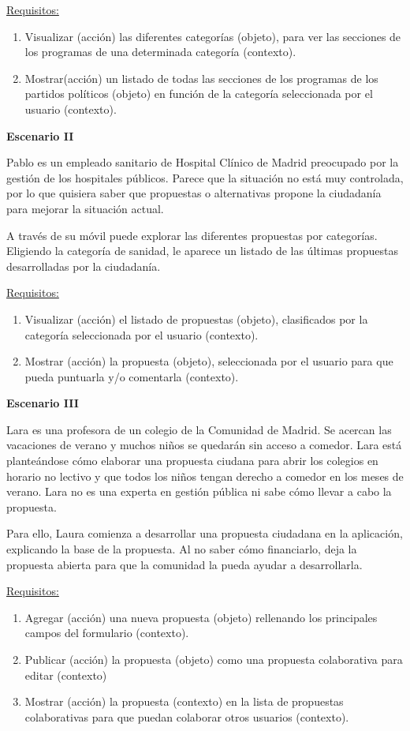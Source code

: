 \underline{Requisitos:}

\begin{enumerate}
\item Visualizar (acción) las diferentes categorías (objeto), para ver las secciones de los programas de una determinada categoría (contexto).
\item Mostrar(acción) un listado de todas las secciones de los programas de los partidos  políticos (objeto) en función de la categoría seleccionada por el usuario (contexto).
\end{enumerate}

\textbf{Escenario II}

Pablo es un empleado sanitario de Hospital Clínico de Madrid preocupado por la gestión de los hospitales públicos. Parece que la situación no está muy controlada, por lo que quisiera saber que propuestas o alternativas propone la ciudadanía para mejorar la situación actual.

A través de su móvil puede explorar las diferentes propuestas por categorías. Eligiendo la categoría de sanidad, le aparece un listado de las últimas propuestas desarrolladas por la ciudadanía.

\underline{Requisitos:}

\begin{enumerate}
\item Visualizar (acción) el listado de propuestas (objeto), clasificados por la categoría seleccionada por el usuario (contexto).
\item Mostrar (acción) la propuesta (objeto), seleccionada por el usuario para que pueda puntuarla y/o comentarla (contexto).
\end{enumerate}

\textbf{Escenario III}

Lara es una profesora de un colegio de la Comunidad de Madrid. Se acercan las vacaciones de verano y muchos niños se quedarán sin acceso a comedor. Lara está planteándose cómo elaborar una propuesta ciudana para abrir los colegios en horario no lectivo y que todos los niños tengan derecho a comedor en los meses de verano. Lara no es una experta en gestión pública ni sabe cómo llevar a cabo la propuesta.

Para ello, Laura comienza a desarrollar una propuesta ciudadana en la aplicación, explicando la base de la propuesta. Al no saber cómo financiarlo, deja la propuesta abierta para que la comunidad la pueda ayudar a desarrollarla.

\underline{Requisitos:}
\begin{enumerate}
\item Agregar (acción) una nueva propuesta (objeto) rellenando los principales campos del formulario (contexto).
\item Publicar (acción) la propuesta (objeto) como una propuesta colaborativa para editar (contexto)
\item Mostrar (acción) la propuesta (contexto) en la lista de propuestas colaborativas para que puedan colaborar otros usuarios (contexto).
\end{enumerate}

